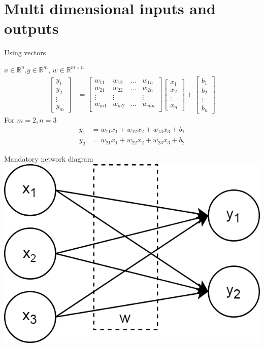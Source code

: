 \section{Multi dimensional inputs and outputs}
\begin{frame}{Using vectors}

		\begin{block}{$x \in \mathbb{R}^n$,$y \in \mathbb{R}^m$, $w\in \mathbb{R}^{m \times n}$}
			\begin{align*}
				\begin{bmatrix}
					y_1 \\
					y_2 \\
					\vdots \\
					y_m
				\end{bmatrix} & =  
				\begin{bmatrix}
					w_{11} & w_{12}& \dots & w_{1n}  \\
					w_{21} & w_{22}& \dots & w_{2n}  \\
					\vdots &\vdots &  & \vdots  \\
					w_{m1} & w_{m2}& \dots & w_{mn}  \\
				\end{bmatrix}
			\begin{bmatrix}
				x_1 \\
				x_2 \\
				\vdots \\
				x_n
			\end{bmatrix} + 
			\begin{bmatrix}
			b_1 \\
			b_2 \\
			\vdots \\
			b_n
			\end{bmatrix}
			\end{align*}
		For $m=2, n=3$
		\begin{align}
		y_1 &= w_{11}x_1 + w_{12}x_2+w_{13}x_3 + b_1 \\
		y_2 &= w_{21}x_1 + w_{22}x_2+w_{23}x_3 + b_2 
		\end{align}
		\end{block}
\end{frame}
\begin{frame}{Mandatory network diagram}
	\includegraphics[width=.6\textwidth, center]{figuras/fully_connected_0_layer.png}	
\end{frame}
